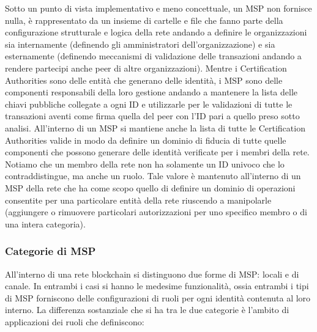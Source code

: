 Sotto un punto di vista implementativo e meno concettuale, un MSP non fornisce nulla, è rappresentato da un insieme di cartelle e file che fanno parte della configurazione strutturale e logica della rete andando a definire le organizzazioni sia internamente (definendo gli amministratori dell'organizzazione) e sia esternamente (definendo meccanismi di validazione delle transazioni andando a rendere partecipi anche peer di altre organizzazioni). Mentre i Certification Authorities sono delle entità che generano delle identità, i MSP sono delle componenti responsabili della loro gestione andando a mantenere la lista delle chiavi pubbliche collegate a ogni ID e utilizzarle per le validazioni di tutte le transazioni aventi come firma quella del peer con l'ID pari a quello preso sotto analisi. All'interno di un MSP si mantiene anche la lista di tutte le Certification Authorities valide in modo da definire un dominio di fiducia di tutte quelle componenti che possono generare delle identità verificate per i membri della rete. Notiamo che un membro della rete non ha solamente un ID univoco che lo contraddistingue, ma anche un ruolo. Tale valore è mantenuto all'interno di un MSP della rete che ha come scopo quello di definire un dominio di operazioni consentite per una particolare entità della rete riuscendo a manipolarle (aggiungere o rimuovere particolari autorizzazioni per uno specifico membro o di una intera categoria).

\subsubsection{Categorie di MSP}
All'interno di una rete blockchain si distinguono due forme di MSP: locali e di canale. In entrambi i casi si hanno le medesime funzionalità, ossia entrambi i tipi di MSP forniscono delle configurazioni di ruoli per ogni identità contenuta al loro interno. La differenza sostanziale che si ha tra le due categorie è l'ambito di applicazioni dei ruoli che definiscono: 

